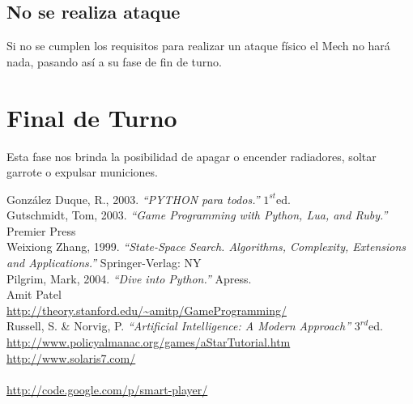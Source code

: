 \documentclass[a4paper,12pt,oneside]{book}
\renewcommand{\baselinestretch}{1.5}
\begin{document}
\subsection*{No se realiza ataque}
Si no se cumplen los requisitos para realizar un ataque físico el Mech no hará nada, pasando así a su fase de fin de turno.

\section{Final de Turno}

Esta fase nos brinda la posibilidad de apagar o encender radiadores,
soltar garrote o expulsar municiones.

\newpage
\renewcommand{\baselinestretch}{1}
\normalsize
\begin{thebibliography}{XXX}
 González Duque, R., 2003. {\it ``PYTHON para todos.''} $1^{st}$ed. \\
 Gutschmidt, Tom, 2003. {\it ``Game Programming with Python,
    Lua, and Ruby.''  } Premier Press \\
 Weixiong Zhang, 1999. {\it ``State-Space Search. Algorithms,
    Complexity, Extensions and Applications.''} Springer-Verlag: NY \\
 Pilgrim, Mark, 2004. {\it ``Dive into Python.''} Apress. \\
 Amit Patel\\ \url{
    http://theory.stanford.edu/~amitp/GameProgramming/} \label{amit}
  \\
 Russell, S. \& Norvig, P. {\it ``Artificial Intelligence: A
    Modern Approach''} $3^{rd}$ed. \\ \label{russell}
  \url{http://www.policyalmanac.org/games/aStarTutorial.htm}\\
  \url{http://www.solaris7.com/ }\\
  \url{ }\\
  \url{http://code.google.com/p/smart-player/ } \label{googlecode}
\end{thebibliography}
\end{document}
